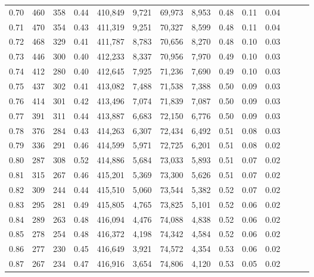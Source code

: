 \begin{tabular}{rrrrrrrrrrrrrr}
0.70 &     460 &    358 &  0.44 &  410,849 &    9,721 &  69,973 &   8,953 &  0.48 &  0.11 &      0.04 \\
0.71 &     470 &    354 &  0.43 &  411,319 &    9,251 &  70,327 &   8,599 &  0.48 &  0.11 &      0.04 \\
0.72 &     468 &    329 &  0.41 &  411,787 &    8,783 &  70,656 &   8,270 &  0.48 &  0.10 &      0.03 \\
0.73 &     446 &    300 &  0.40 &  412,233 &    8,337 &  70,956 &   7,970 &  0.49 &  0.10 &      0.03 \\
0.74 &     412 &    280 &  0.40 &  412,645 &    7,925 &  71,236 &   7,690 &  0.49 &  0.10 &      0.03 \\
0.75 &     437 &    302 &  0.41 &  413,082 &    7,488 &  71,538 &   7,388 &  0.50 &  0.09 &      0.03 \\
0.76 &     414 &    301 &  0.42 &  413,496 &    7,074 &  71,839 &   7,087 &  0.50 &  0.09 &      0.03 \\
0.77 &     391 &    311 &  0.44 &  413,887 &    6,683 &  72,150 &   6,776 &  0.50 &  0.09 &      0.03 \\
0.78 &     376 &    284 &  0.43 &  414,263 &    6,307 &  72,434 &   6,492 &  0.51 &  0.08 &      0.03 \\
0.79 &     336 &    291 &  0.46 &  414,599 &    5,971 &  72,725 &   6,201 &  0.51 &  0.08 &      0.02 \\
0.80 &     287 &    308 &  0.52 &  414,886 &    5,684 &  73,033 &   5,893 &  0.51 &  0.07 &      0.02 \\
0.81 &     315 &    267 &  0.46 &  415,201 &    5,369 &  73,300 &   5,626 &  0.51 &  0.07 &      0.02 \\
0.82 &     309 &    244 &  0.44 &  415,510 &    5,060 &  73,544 &   5,382 &  0.52 &  0.07 &      0.02 \\
0.83 &     295 &    281 &  0.49 &  415,805 &    4,765 &  73,825 &   5,101 &  0.52 &  0.06 &      0.02 \\
0.84 &     289 &    263 &  0.48 &  416,094 &    4,476 &  74,088 &   4,838 &  0.52 &  0.06 &      0.02 \\
0.85 &     278 &    254 &  0.48 &  416,372 &    4,198 &  74,342 &   4,584 &  0.52 &  0.06 &      0.02 \\
0.86 &     277 &    230 &  0.45 &  416,649 &    3,921 &  74,572 &   4,354 &  0.53 &  0.06 &      0.02 \\
0.87 &     267 &    234 &  0.47 &  416,916 &    3,654 &  74,806 &   4,120 &  0.53 &  0.05 &      0.02 \\

\end{tabular}
